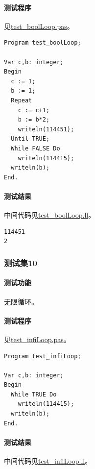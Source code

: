 \documentclass[lang=cn,11pt,a4paper,cite=authornum]{paper}
\begin{document}
\paragraph{测试程序} 见\href{run:../test/test_boolLoop.pas}{test\_boolLoop.pas}。

\begin{code}
    \begin{verbatim}
Program test_boolLoop;

Var c,b: integer;
Begin
  c := 1;
  b := 1;
  Repeat
    c := c+1;
    b := b*2;
    writeln(114451);
  Until TRUE;
  While FALSE Do
    writeln(114415);
  writeln(b);
End.
\end{verbatim}
\end{code}

\paragraph{测试结果} 中间代码见\href{run:../test/test_boolLoop.ll}{test\_boolLoop.ll}。

\begin{code}
    \begin{verbatim}
114451
2
\end{verbatim}
\end{code}

\subsubsection{测试集10}

\paragraph{测试功能} 无限循环。

\paragraph{测试程序} 见\href{run:../test/test_infiLoop.pas}{test\_infiLoop.pas}。

\begin{code}
    \begin{verbatim}
Program test_infiLoop;

Var c,b: integer;
Begin
  While TRUE Do
    writeln(114415);
  writeln(b);
End.
\end{verbatim}
\end{code}

\paragraph{测试结果} 中间代码见\href{run:../test/test_infiLoop.ll}{test\_infiLoop.ll}。
\end{document}
